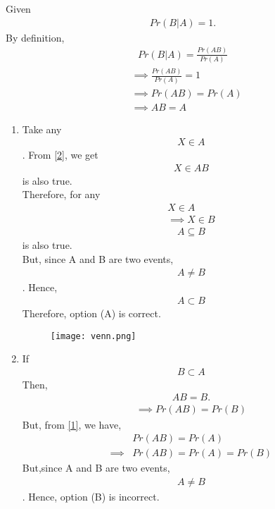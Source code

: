 \documentclass[journal,12pt,twocolumn]{IEEEtran}
\begin{document}
Given 
\begin{align}
Pr(B | A)=1. 
\end{align}
By definition,
\begin{align}
Pr(B|A)=\frac{Pr(AB)}{Pr(A)}
\end{align}
\begin{align}
&\implies\frac{Pr(AB)}{Pr(A)} = 1\\
&\implies Pr(AB) = Pr(A)\label{1}\\
&\implies AB= A\label{2}
\end{align}
\begin{enumerate}[label={\Alph*)}]
\item Take any 
\begin{align}
    X \in A
\end{align} . From \eqref{2}, we get
\begin{align}
     X \in AB
\end{align}is also true.\\
Therefore, for any 
\begin{align}
  X \in A \\
  \implies X \in B   
\end{align}
    \begin{align}
     A \subseteq B 
\end{align}is also true.\\
    But, since A and B are two events,
    \begin{align}
       A\neq B 
    \end{align}. Hence,
    \begin{align}
    A \subset B
\end{align}
Therefore, option (A) is correct.
\begin{figure}[h]
    \centering
    \texttt{[image: venn.png]}
    
    \label*{Venn diagram}
\end{figure}

\item If 
\begin{align}
  B \subset A  
\end{align}
Then, 
\begin{align}
AB=B.
\end{align}
\begin{align}
\implies Pr(AB)=Pr(B)
\end{align}
But, from \eqref{1}, we have, 
\begin{align}
&Pr(AB)=Pr(A)\\
\implies &Pr(AB)=Pr(A)=Pr(B)
\end{align}
But,since A and B are two events, 
\begin{align}
    A\neq B
\end{align}. Hence, option (B) is incorrect.


\end{enumerate}
\end{document}
